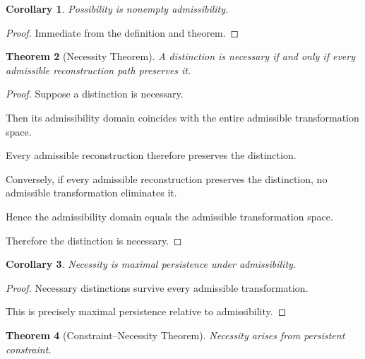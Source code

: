 \documentclass[12pt,oneside]{article}
\newtheorem{theorem}{Theorem}[section] \newtheorem{lemma}[theorem]{Lemma} \newtheorem{proposition}[theorem]{Proposition} \newtheorem{corollary}[theorem]{Corollary}
\theoremstyle{definition}
\begin{document}
\begin{corollary}

Possibility is nonempty admissibility.

\end{corollary}

\begin{proof}

Immediate from the definition and theorem.

\end{proof}

\begin{theorem}[Necessity Theorem]

A distinction is necessary if and only if every admissible reconstruction path preserves it.

\end{theorem}

\begin{proof}

Suppose a distinction is necessary.

Then its admissibility domain coincides with the entire admissible transformation space.

Every admissible reconstruction therefore preserves the distinction.

Conversely, if every admissible reconstruction preserves the distinction, no admissible transformation eliminates it.

Hence the admissibility domain equals the admissible transformation space.

Therefore the distinction is necessary.

\end{proof}

\begin{corollary}

Necessity is maximal persistence under admissibility.

\end{corollary}

\begin{proof}

Necessary distinctions survive every admissible transformation.

This is precisely maximal persistence relative to admissibility.

\end{proof}

\begin{theorem}[Constraint–Necessity Theorem]

Necessity arises from persistent constraint.

\end{theorem}
\end{document}
